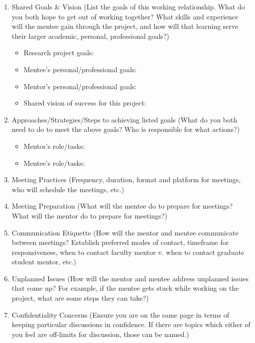 \begin{enumerate}

\item  Shared Goals \& Vision (List the goals of this working relationship. What do you both hope to get out of working together? What skills and experience will the mentee gain through the project, and how will that learning serve their larger academic, personal, professional goals?)

\begin{itemize}	
\item Research project goals:
\item Mentee’s personal/professional goals:
\item Mentor’s personal/professional goals: 
\item Shared vision of success for this project: 
\end{itemize}

\item Approaches/Strategies/Steps to achieving listed goals (What do you both need to do to meet the above goals? Who is responsible for what actions?)
 
\begin{itemize}
\item Mentor’s role/tasks:
\item Mentee’s role/tasks:
\end{itemize}
 

\item Meeting Practices (Frequency, duration, format and platform for meetings, who will schedule the meetings, etc.)



\item Meeting Preparation (What will the mentee do to prepare for meetings? What will the mentor do to prepare for meetings?)
 
 
 
\item Communication Etiquette (How will the mentor and mentee communicate between meetings? Establish preferred modes of contact, timeframe for responsiveness, when to contact faculty mentor v. when to contact graduate student mentor, etc.)



\item Unplanned Issues (How will the mentor and mentee address unplanned issues that come up? For example, if the mentee gets stuck while working on the project, what are some steps they can take?)



\item Confidentiality Concerns (Ensure you are on the same page in terms of keeping particular discussions in confidence. If there are topics which either of you feel are off-limits for discussion, those can be named.)
 
 \end{enumerate}



